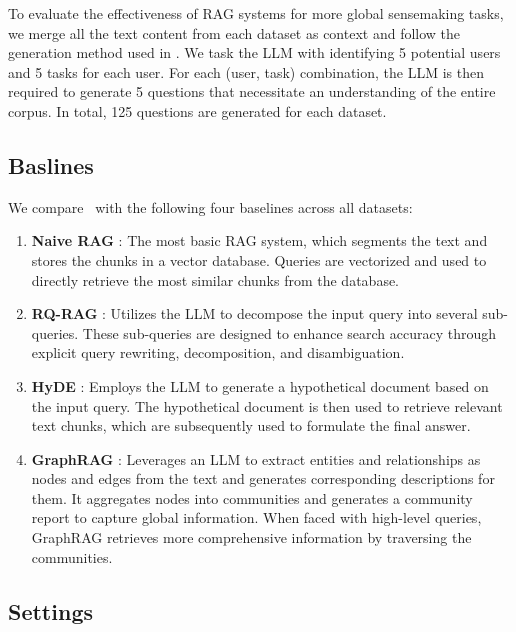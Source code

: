 To evaluate the effectiveness of RAG systems for more global sensemaking tasks, we merge all the text content from each dataset as context and follow the generation method used in \cite{edge2024local}. We task the LLM with identifying 5 potential users and 5 tasks for each user. For each (user, task) combination, the LLM is then required to generate 5 questions that necessitate an understanding of the entire corpus. In total, 125 questions are generated for each dataset.

\subsection{Baslines}
We compare \model\ with the following four baselines across all datasets:

\begin{enumerate}
    \item \textbf{Naive RAG} \cite{gao2023retrieval}: The most basic RAG system, which segments the text and stores the chunks in a vector database. Queries are vectorized and used to directly retrieve the most similar chunks from the database.
    
    \item \textbf{RQ-RAG} \cite{chan2024rq}: Utilizes the LLM to decompose the input query into several sub-queries. These sub-queries are designed to enhance search accuracy through explicit query rewriting, decomposition, and disambiguation.
    
    \item \textbf{HyDE} \cite{hyde}: Employs the LLM to generate a hypothetical document based on the input query. The hypothetical document is then used to retrieve relevant text chunks, which are subsequently used to formulate the final answer.
    
    \item \textbf{GraphRAG} \cite{edge2024local}: Leverages an LLM to extract entities and relationships as nodes and edges from the text and generates corresponding descriptions for them. It aggregates nodes into communities and generates a community report to capture global information. When faced with high-level queries, GraphRAG retrieves more comprehensive information by traversing the communities.
\end{enumerate}

\subsection{Settings}

